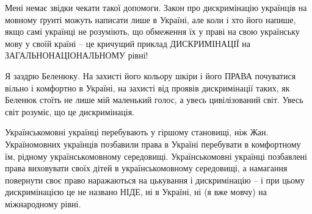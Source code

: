 Мені немає звідки чекати такої допомоги. Закон про дискримінацію українців на
мовному ґрунті можуть написати лише в Україні, але коли і хто його напише, якщо
самі українці не розуміють, що обмеження їх у праві на свою українську мову у
своїй країні – це кричущий приклад ДИСКРИМІНАЦІЇ на ЗАГАЛЬНОНАЦІОНАЛЬНОМУ
рівні!

Я заздрю Беленюку. На захисті його кольору шкіри і його ПРАВА почуватися вільно
і комфортно в Україні, на захисті від проявів дискримінації таких, як Беленюк
стоїть не лише мій маленький голос, а увесь цивілізований світ. Увесь світ
розуміє, що це дискримінація.

Українськомовні українці перебувають у гіршому становищі, ніж Жан.
Україномовних українців позбавили права в Україні перебувати в комфортному їм,
рідному українськомовному середовищі. Українськомовні українці позбавлені права
виховувати своїх дітей в українськомовному середовищі,  а намагання повернути
своє право наражаються на цькування і дискримінацію – і при цьому
дискримінацією це не названо НІДЕ, ні в Україні, ні (я вже мовчу) на
міжнародному рівні.


